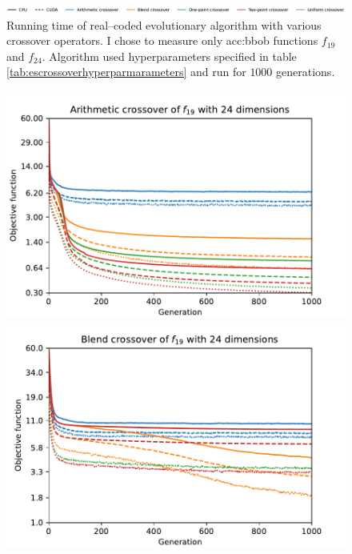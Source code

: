 \begin{figure}[ht!]
    \begin{minipage}{\textwidth}
        \centering
        \includegraphics[width=\textwidth]{img/runs/time_es_crossover_legend.pdf}
    \end{minipage}

    \caption[Running time of crossover operators]{Running time of real--coded evolutionary algorithm with various crossover operators. I chose to measure only \acrshort{acc:bbob} functions $f_{19}$ and $f_{24}$. Algorithm used hyperparameters specified in table \ref{tab:escrossoverhyperparmarameters} and run for $1000$ generations.}
    \label{meas:crosstime}
\end{figure}


\begin{figure}[ht!]
    \begin{minipage}[t]{0.32\textwidth}
        \centering
        \includegraphics[width=\textwidth]{img/runs/fitness_es_crossover_f19_dim24_Arithmetic.pdf}
    \end{minipage}
    \hfill
    \begin{minipage}[t]{0.32\textwidth}
        \centering
        \includegraphics[width=\textwidth]{img/runs/fitness_es_crossover_f19_dim24_Blend.pdf}

\end{minipage}
\end{figure}
